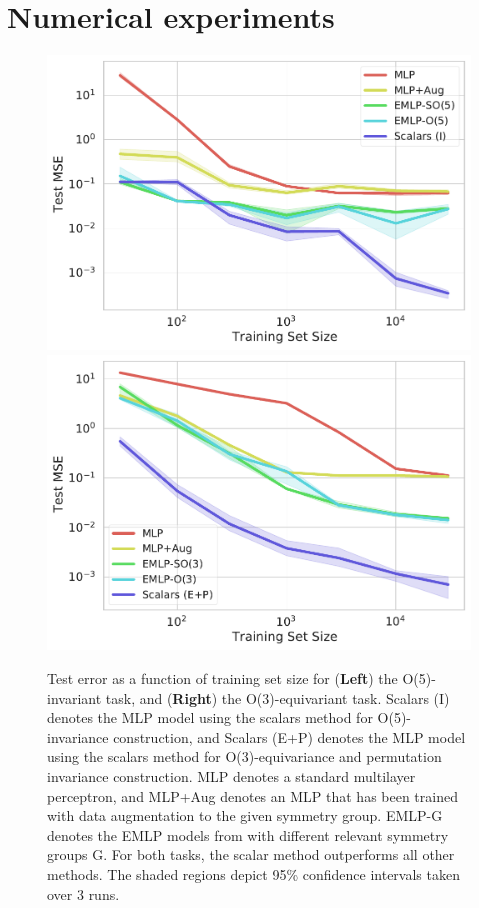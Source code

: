 \documentclass{article}
\theoremstyle{Hogg}
\begin{document}
\section{Numerical experiments}
\begin{figure}[t]
   \centering
   \includegraphics[scale=0.4]{data_efficiency_O5Synthetic.pdf}
   \includegraphics[scale=0.4]{data_efficiency_Inertia.pdf}
   \caption{{\small Test error as a function of training set size for (\textbf{Left}) the O(5)-invariant task, and (\textbf{Right}) the O(3)-equivariant task. Scalars (I) denotes the MLP model using the scalars method for O(5)-invariance construction, and Scalars (E+P) denotes the MLP model using the scalars method for O(3)-equivariance and permutation invariance construction.
   MLP denotes a standard multilayer perceptron, and MLP+Aug denotes an MLP that has been trained with data augmentation to the given symmetry group.
   EMLP-G denotes the EMLP models from \cite{finzi2021practical} with different relevant symmetry groups G.
   For both tasks, the scalar method 
   outperforms all other methods. The shaded regions depict 95\% confidence intervals taken over 3 runs.}}
   \label{fig:numerical}
   \vspace{-.4cm}
\end{figure}
\end{document}
